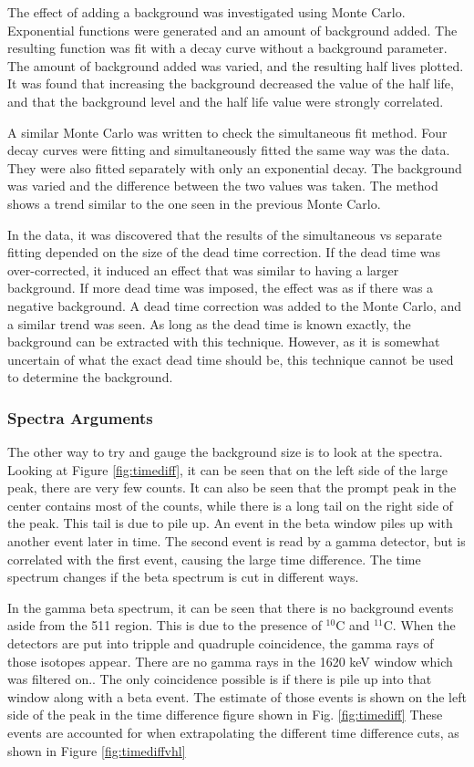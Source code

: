 \documentclass[main.tex]{subfiles}
\begin{document}
The effect of adding a background was investigated using Monte Carlo.
Exponential functions were generated and an amount of background added.
The resulting function was fit with a decay curve without a background parameter.
The amount of background added was varied, and the resulting half lives plotted.
It was found that increasing the background decreased the value of the half life, and that the background level and the half life value were strongly correlated.

A similar Monte Carlo was written to check the simultaneous fit method.
Four decay curves were fitting and simultaneously fitted the same way was the data.
They were also fitted separately with only an exponential decay.
The background was varied and the difference between the two values was taken.
The method shows a trend similar to the one seen in the previous Monte Carlo.

In the data, it was discovered that the results of the simultaneous vs separate fitting depended on the size of the dead time correction.
If the dead time was over-corrected, it induced an effect that was similar to having a larger background.
If more dead time was imposed, the effect was as if there was a negative background.
A dead time correction was added to the Monte Carlo, and a similar trend was seen.
As long as the dead time is known exactly, the background can be extracted with this technique. 
However, as it is somewhat uncertain of what the exact dead time should be, this technique cannot be used to determine the background.

\subsubsection{Spectra Arguments}
The other way to try and gauge the background size is to look at the spectra.
Looking at Figure \ref{fig:timediff}, it can be seen that on the left side of the large peak, there are very few counts.
It can also be seen that the prompt peak in the center contains most of the counts, while there is a long tail on the right side of the peak.
This tail is due to pile up. 
An event in the beta window piles up with another event later in time. 
The second event is read by a gamma detector, but is correlated with the first event, causing the large time difference.
The time spectrum changes if the beta spectrum is cut in different ways.

In the gamma beta spectrum, it can be seen that there is no background events aside from the 511 region.
This is due to the presence of $^{10}$C and $^{11}$C.
When the detectors are put into tripple and quadruple coincidence, the gamma rays of those isotopes appear.
There are no gamma rays in the 1620 keV window which was filtered on..
The only coincidence possible is if there is pile up into that window along with a beta event.
The estimate of those events is shown on the left side of the peak in the time difference figure shown in Fig. \ref{fig:timediff}  
These events are accounted for when extrapolating the different time difference cuts, as shown in Figure \ref{fig:timediffvhl}
\end{document}
